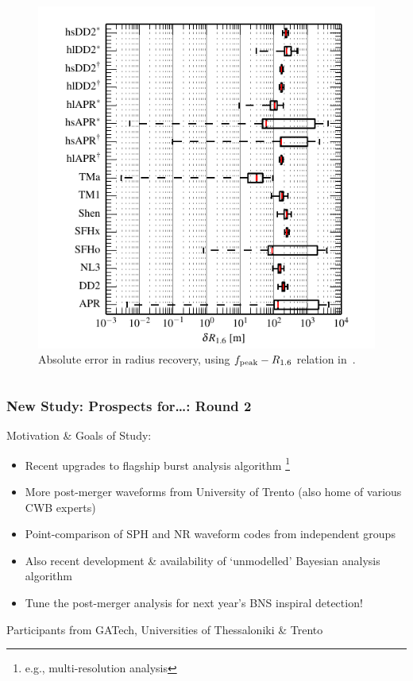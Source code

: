 \documentclass[serif,mathserif,10pt]{beamer}
\let\oldframetitle\frametitle%
\renewcommand{\frametitle}[1]{%
      \oldframetitle{#1}\setstretch{1.2}}
\begin{document}
\begin{frame}
\begin{columns}[]
        \begin{center}
            \vspace{-0.5cm}
            \begin{figure}
                \includegraphics[width=1\columnwidth]{figures/deltaRadii.pdf}
                \caption{Absolute error in radius recovery, using $f_{\rm
                peak}-R_{1.6}$ relation in~\cite{bauswein:12}.}
            \end{figure}
        \end{center}

    \end{columns}

\end{frame}



\begin{frame}
    \frametitle{New Study: Prospects for\dots: Round 2}
    Motivation \& Goals of Study:
    \begin{itemize}
        \item Recent upgrades to flagship burst analysis algorithm \footnote{e.g.,
            multi-resolution analysis}
        \item More post-merger waveforms from University of Trento (also
            home of various CWB experts)
        \item Point-comparison of SPH and NR waveform codes from independent
            groups
        \item Also recent development \& availability of `unmodelled' Bayesian
            analysis algorithm
        \item Tune the post-merger analysis for next year's BNS inspiral detection!
    \end{itemize}

    Participants from GATech, Universities of Thessaloniki \& Trento

\end{frame}
\end{document}
